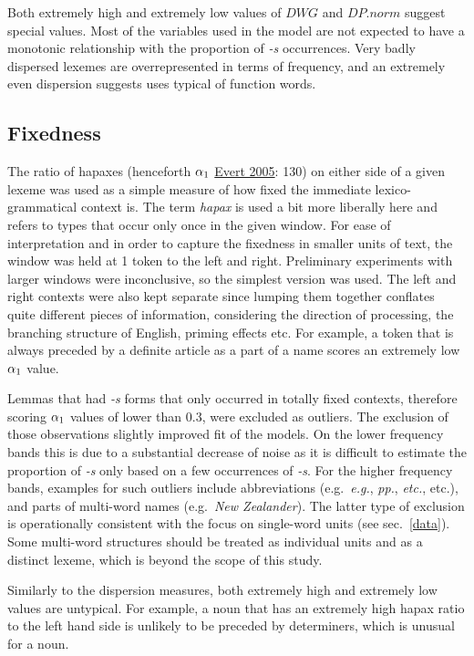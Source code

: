 \documentclass[
]{article}
\begin{document}
Both extremely high and extremely low values of \(DWG\) and \(DP.norm\)
suggest special values. Most of the variables used in the model are not
expected to have a monotonic relationship with the proportion of
\emph{-s} occurrences. Very badly dispersed lexemes are overrepresented
in terms of frequency, and an extremely even dispersion suggests uses
typical of function words.

\hypertarget{hapax}{%
\subsection{Fixedness}\label{hapax}}

The ratio of hapaxes (henceforth \(\alpha\textsubscript{1}\)
\protect\hyperlink{ref-evert05}{Evert 2005}: 130) on either side of a
given lexeme was used as a simple measure of how fixed the immediate
lexico-grammatical context is. The term \emph{hapax} is used a bit more
liberally here and refers to types that occur only once in the given
window. For ease of interpretation and in order to capture the fixedness
in smaller units of text, the window was held at 1 token to the left and
right. Preliminary experiments with larger windows were inconclusive, so
the simplest version was used. The left and right contexts were also
kept separate since lumping them together conflates quite different
pieces of information, considering the direction of processing, the
branching structure of English, priming effects etc. For example, a
token that is always preceded by a definite article as a part of a name
scores an extremely low \(\alpha\textsubscript{1}\) value.

Lemmas that had \emph{-s} forms that only occurred in totally fixed
contexts, therefore scoring \(\alpha\textsubscript{1}\) values of lower
than 0.3, were excluded as outliers. The exclusion of those observations
slightly improved fit of the models. On the lower frequency bands this
is due to a substantial decrease of noise as it is difficult to estimate
the proportion of \emph{-s} only based on a few occurrences of
\emph{-s}. For the higher frequency bands, examples for such outliers
include abbreviations (e.g.~\emph{e.g.}, \emph{pp.}, \emph{etc.}, etc.),
and parts of multi-word names (e.g.~\emph{New Zealander}). The latter
type of exclusion is operationally consistent with the focus on
single-word units (see sec.~\ref{data}). Some multi-word structures
should be treated as individual units and as a distinct lexeme, which is
beyond the scope of this study.

Similarly to the dispersion measures, both extremely high and extremely
low values are untypical. For example, a noun that has an extremely high
hapax ratio to the left hand side is unlikely to be preceded by
determiners, which is unusual for a noun.
\end{document}
